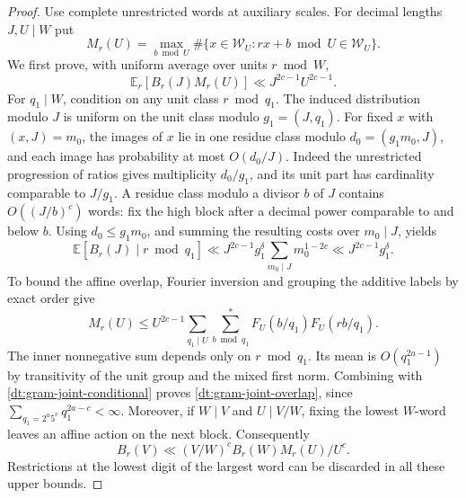 \documentclass[11pt,a4paper]{article}
\theoremstyle{paperplain}
\numberwithin{equation}{section}
\begin{document}
\begin{proof}
Use complete unrestricted words at auxiliary scales. For
decimal lengths \(J,U\mid W\) put
\[
 M_r(U)=\max_{b\bmod U}\#\{x\in\mathcal W_U:
                                    rx+b\bmod U\in\mathcal W_U\}.
\]
We first prove, with uniform average over units \(r\bmod W\),
\begin{equation}
        \mathbb E_r[B_r(J)M_r(U)]\ll J^{2c-1}U^{2c-1}.
 \label{dt:gram-joint-overlap}
\end{equation}
For \(q_1\mid W\), condition on any unit class \(r\bmod q_1\).
The induced distribution modulo \(J\) is uniform on the unit
class modulo \(g_1=(J,q_1)\). For fixed \(x\) with
\((x,J)=m_0\), the images of \(x\) lie in one residue class
modulo \(d_0=(g_1m_0,J)\), and each image has probability at
most \(O(d_0/J)\). Indeed the unrestricted progression of
ratios gives multiplicity \(d_0/g_1\), and its unit part has
cardinality comparable to \(J/g_1\). A residue class modulo a
divisor \(b\) of \(J\) contains \(O((J/b)^c)\) words: fix the
high block after a decimal power comparable to and below \(b\).
Using \(d_0\le g_1m_0\), and summing the resulting costs over
\(m_0\mid J\), yields
\begin{equation}
 \mathbb E[B_r(J)\mid r\bmod q_1]\ll
  J^{2c-1}g_1^\delta\sum_{m_0\mid J}m_0^{1-2c}
                       \ll J^{2c-1}g_1^\delta .
 \label{dt:gram-joint-conditional}
\end{equation}
To bound the affine overlap, Fourier inversion and grouping
the additive labels by exact order give
\[
 M_r(U)\le U^{2c-1}\sum_{q_1\mid U}
              \sum_{b\bmod q_1}^{*} F_U(b/q_1)F_U(rb/q_1).
\]
The inner nonnegative sum depends only on \(r\bmod q_1\).
Its mean is \(O(q_1^{2a-1})\) by transitivity of the unit
group and the mixed first norm. Combining with
\eqref{dt:gram-joint-conditional} proves
\eqref{dt:gram-joint-overlap}, since
\(\sum_{q_1=2^u5^v}q_1^{2a-c}<\infty\).
Moreover, if \(W\mid V\) and \(U\mid V/W\), fixing the
lowest \(W\)-word leaves an affine action on the next block.
Consequently
\begin{equation}
          B_r(V)\ll (V/W)^c B_r(W)M_r(U)/U^c .
 \label{dt:gram-affine-lift}
\end{equation}
Restrictions at the lowest digit of the largest word can be
discarded in all these upper bounds.


\end{proof}
\end{document}
